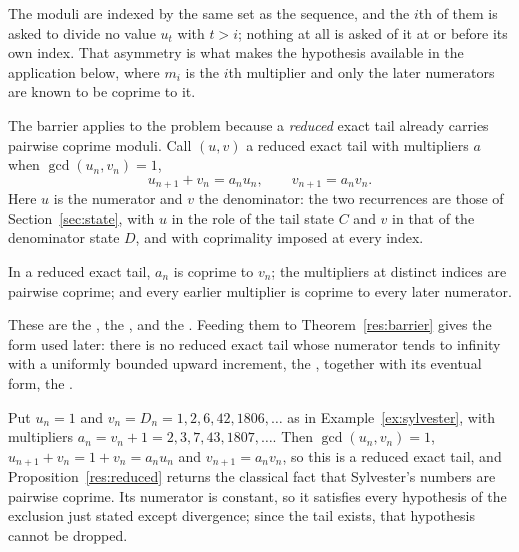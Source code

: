 \documentclass[11pt]{article}
\begin{document}
The moduli are indexed by the same set as the sequence, and the $i$th of them
is asked to divide no value $u_t$ with $t>i$; nothing at all is asked of it at
or before its own index.  That asymmetry is what makes the hypothesis available
in the application below, where $m_i$ is the $i$th multiplier and only the
later numerators are known to be coprime to it.

The barrier applies to the problem because a \emph{reduced} exact tail already
carries pairwise coprime moduli.  Call $(u,v)$ a reduced exact tail with
multipliers $a$ when $\gcd(u_n,v_n)=1$,
\[
 u_{n+1}+v_n=a_nu_n,\qquad v_{n+1}=a_nv_n .
\]
Here $u$ is the numerator and $v$ the denominator: the two recurrences are
those of Section~\ref{sec:state}, with $u$ in the role of the tail state $C$
and $v$ in that of the denominator state $D$, and with coprimality imposed at
every index.

\begin{proposition}\label{res:reduced}
In a reduced exact tail, $a_n$ is coprime to $v_n$; the multipliers at distinct
indices are pairwise coprime; and every earlier multiplier is coprime to every
later numerator.
\end{proposition}

\noindent These are the
, the
, and the
.  Feeding them to Theorem~\ref{res:barrier} gives the form used
later: there is no reduced exact tail whose numerator tends to infinity with a
uniformly bounded upward increment, the
, together with its eventual form, the
.

\begin{example}\label{ex:reduced}
Put $u_n=1$ and $v_n=D_n=1,2,6,42,1806,\ldots$ as in
Example~\ref{ex:sylvester}, with multipliers $a_n=v_n+1=2,3,7,43,1807,\ldots$.
Then $\gcd(u_n,v_n)=1$, $u_{n+1}+v_n=1+v_n=a_nu_n$ and $v_{n+1}=a_nv_n$, so
this is a reduced exact tail, and Proposition~\ref{res:reduced} returns the
classical fact that Sylvester's numbers are pairwise coprime.  Its numerator is
constant, so it satisfies every hypothesis of the exclusion just stated except
divergence; since the tail exists, that hypothesis cannot be dropped.
\end{example}
\end{document}
